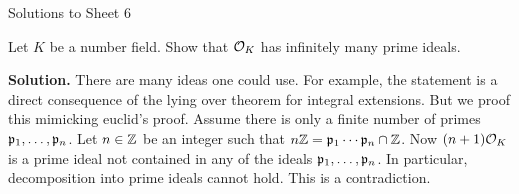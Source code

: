 \documentclass[a4paper,11pt]{article}
\begin{document}
\begin{center}
    \huge{Solutions to Sheet 6}
\end{center}

Let $K$ be a number field. Show that $\mathcal{O}_K$ has infinitely many
prime ideals.

\textbf{Solution.}
There are many ideas one could use. For example, the statement is a direct 
consequence of the lying over theorem for integral extensions. But we proof this
mimicking euclid's proof. Assume there is only a finite number of primes
$\mathfrak{p}_1, \dots, \mathfrak{p}_n$. Let $n \in \mathbb{Z}$ be an integer such that 
$n\mathbb{Z} = \mathfrak{p}_1 \cdots \mathfrak{p}_n \cap \mathbb{Z}$. Now $(n+1)\mathcal{O}_K$ is a prime ideal not contained
in any of the ideals $\mathfrak{p}_1, \dots, \mathfrak{p}_n$. In particular, decomposition into prime ideals
cannot hold. This is a contradiction.
\end{document}
